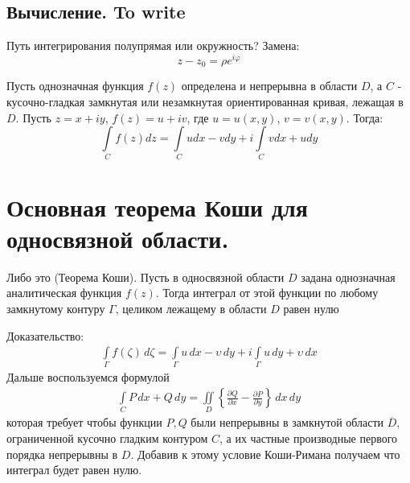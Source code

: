 \documentclass[12pt]{extarticle}
\renewcommand{\v}{\upsilon}
\renewcommand{\d}{\,d}
\begin{document}
\subsection{Вычисление. To write}
\par Путь интегрирования полупрямая или окружность? Замена:
\begin{displaymath}
    z-z_{0}=\rho e^{i\varphi}
\end{displaymath}
\par Пусть однозначная функция $f(z)$ определена и непрерывна в области $D$,
а $C$ - кусочно-гладкая замкнутая или незамкнутая ориентированная
кривая, лежащая в $D$. Пусть $z=x+iy$, $f(z)=u+iv$, где $u=u(x,y)$,
$v=v(x,y)$. Тогда:
\begin{displaymath}
    \int\limits_{C}f(z)dz=\int\limits_{C}udx-vdy +
    i\int\limits_{C}vdx+udy
\end{displaymath}


\section{Основная теорема Коши для односвязной области.}

\par Либо это (Теорема Коши). Пусть в односвязной области $D$ задана
однозначная аналитическая функция $f(z)$. Тогда интеграл от этой функции
по любому замкнутому контуру $\Gamma$, целиком лежащему в области $D$
равен нулю
\par Доказательство:
\begin{eqnarray*}
    \int\limits_{\Gamma}f(\zeta)\d{\zeta}=\int\limits_{\Gamma}u\d{x}-\v\d{y}
    +i\int\limits_{\Gamma}u\d{y}+\v\d{x}
\end{eqnarray*}
Дальше воспользуемся формулой
\begin{eqnarray*}
    \int\limits_{C}P\d{x}+Q\d{y}
    =\iint\limits_{D}\left\{\frac{\partial Q}{\partial x}
    -\frac{\partial P}{\partial y}\right\}\d{x}\d{y}
\end{eqnarray*}
которая требует чтобы функции $P,Q$ были непрерывны в замкнутой области
$\overline{D}$, ограниченной кусочно гладким контуром $C$, а их частные
производные первого порядка непрерывны в $D$. Добавив к этому условие
Коши-Римана получаем что интеграл будет равен нулю.
\end{document}

